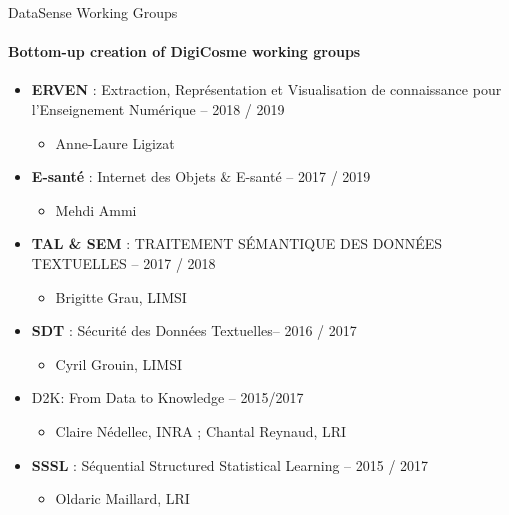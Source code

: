 \begin{frame}{DataSense Working Groups}
  \framesubtitle{Bottom-up creation of DigiCosme working groups}

      \begin{itemize}
       \item {\small \textbf{ERVEN} : Extraction, Représentation et Visualisation de connaissance pour
l'Enseignement Numérique -- 2018 / 2019}
        \begin{itemize}
        \item Anne-Laure Ligizat
        \end{itemize}

        \item \textbf{E-santé} : Internet des Objets \& E-santé -- 2017 / 2019
        \begin{itemize}
        \item Mehdi Ammi
        \end{itemize}

        \item \textbf{TAL \& SEM} : TRAITEMENT SÉMANTIQUE DES DONNÉES TEXTUELLES -- 2017 / 2018
        \begin{itemize}
        \item  Brigitte Grau, LIMSI
        \end{itemize}

        \item \textbf{SDT} : Sécurité des Données Textuelles-- 2016 / 2017
        \begin{itemize}
        \item Cyril Grouin, LIMSI
        \end{itemize}

      \item D2K: From Data to Knowledge -- 2015/2017
        \begin{itemize}
        \item Claire Nédellec, INRA ; Chantal Reynaud, LRI 
        \end{itemize}

        \item \textbf{SSSL} : Séquential Structured Statistical Learning – 2015 / 2017
          \begin{itemize}
          \item Oldaric Maillard, LRI
          \end{itemize}
      \end{itemize}    
\end{frame}

